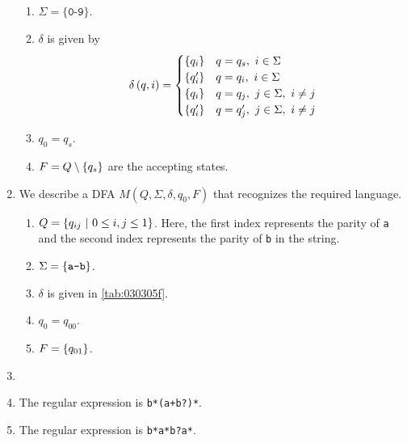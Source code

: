 \begin{solution}
\begin{enumerate}[label=\alph*)]
\begin{enumerate}[label=\roman*)]
            \item $\Sigma = \{\texttt{0-9}\}$.
            \item $\delta$ is given by
            \begin{align*}
                \delta\left( q, i \right) = 
                \begin{cases}
                    \left\{ q_i \right\} & q = q_s,\ i \in \Sigma \\
                    \left\{ q_i' \right\} & q = q_i,\ i \in \Sigma \\
                    \left\{ q_i \right\} & q = q_j,\ j \in \Sigma,\ i \neq j \\
                    \left\{ q_i' \right\} & q = q_j',\ j \in \Sigma,\ i \neq j
                \end{cases}
            \end{align*}
            \item $q_0 = q_s$.
            \item $F = Q \setminus \left\{ q_s \right\}$ are the accepting states.
        \end{enumerate}
        \item We describe a DFA $M(Q, \Sigma, \delta, q_0, F)$ that recognizes 
        the required language.
        \begin{enumerate}[label=\roman*)]
            \item $Q = \left\{ q_{ij}\ |\ 0 \le i, j \le 1 \right\}$. Here, the first 
            index represents the parity of \texttt{a} and the second index 
            represents the parity of \texttt{b} in the string.
            \item $\Sigma = \left\{ \texttt{a-b} \right\}$.
            \item $\delta$ is given in \autoref{tab:030305f}.
            
            \item $q_0 = q_{00}$.
            \item $F = \left\{ q_{01} \right\}$.
        \end{enumerate}
        \item 
        \item The regular expression is \texttt{b*(a+b?)*}.
        \item The regular expression is \texttt{b*a*b?a*}.
    \end{enumerate}
\end{solution}